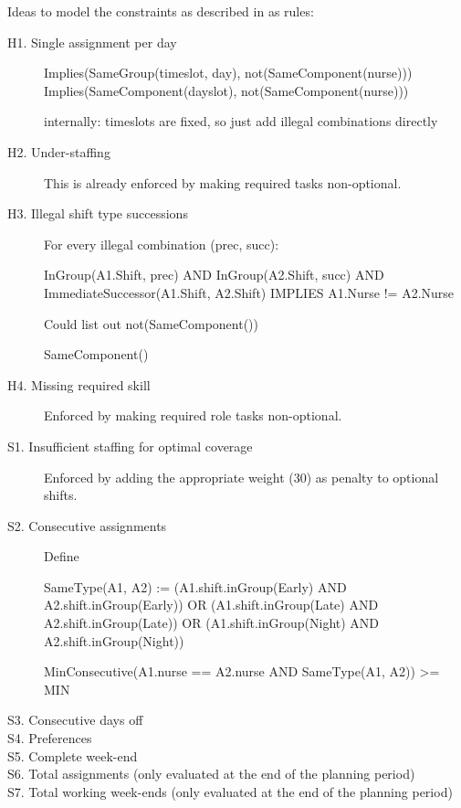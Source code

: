 Ideas to model the constraints as described in \cite{ceschia2019second} as rules:
\begin{description}
\item[H1. Single assignment per day]

Implies(SameGroup(timeslot, day), not(SameComponent(nurse)))
Implies(SameComponent(dayslot), not(SameComponent(nurse)))

internally:
timeslots are fixed, so just add illegal combinations directly


\item[H2. Under-staffing]
This is already enforced by making required tasks non-optional.

\item[H3. Illegal shift type successions]
For every illegal combination (prec, succ):

InGroup(A1.Shift, prec) AND InGroup(A2.Shift, succ) AND ImmediateSuccessor(A1.Shift, A2.Shift) IMPLIES A1.Nurse != A2.Nurse

Could list out not(SameComponent())

SameComponent()

\item[H4. Missing required skill]
Enforced by making required role tasks non-optional.

\item[S1. Insufficient staffing for optimal coverage]
Enforced by adding the appropriate weight (30) as penalty to optional shifts.

\item[S2. Consecutive assignments]

Define 

SameType(A1, A2) := (A1.shift.inGroup(Early) AND A2.shift.inGroup(Early)) OR (A1.shift.inGroup(Late) AND A2.shift.inGroup(Late)) OR (A1.shift.inGroup(Night) AND A2.shift.inGroup(Night))

MinConsecutive(A1.nurse == A2.nurse AND SameType(A1, A2)) >= MIN

\item[S3. Consecutive days off]


\item[S4. Preferences]

\item[S5. Complete week-end]

\item[S6. Total assignments (only evaluated at the end of the planning period)]

\item[S7. Total working week-ends (only evaluated at the end of the planning period)]


\end{description}

